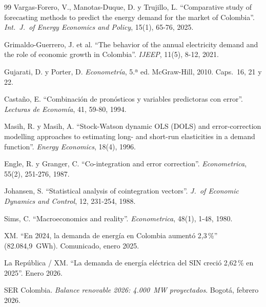 \documentclass[11pt,letterpaper]{article}
\begin{document}
\begin{thebibliography}{99}
 Vargas-Forero, V., Manotas-Duque, D. y Trujillo, L.
``Comparative study of forecasting methods to predict the energy demand for
the market of Colombia''. \emph{Int.\ J.\ of Energy Economics and Policy},
15(1), 65-76, 2025.

 Grimaldo-Guerrero, J. et al. ``The behavior of the
annual electricity demand and the role of economic growth in Colombia''.
\emph{IJEEP}, 11(5), 8-12, 2021.

 Gujarati, D. y Porter, D. \emph{Econometría}, 5.ª ed.
McGraw-Hill, 2010. Caps.\ 16, 21 y 22.

 Castaño, E. ``Combinación de pronósticos y variables
predictoras con error''. \emph{Lecturas de Economía}, 41, 59-80, 1994.

 Masih, R. y Masih, A. ``Stock-Watson dynamic OLS (DOLS)
and error-correction modelling approaches to estimating long- and short-run
elasticities in a demand function''. \emph{Energy Economics}, 18(4), 1996.

 Engle, R. y Granger, C. ``Co-integration and error
correction''. \emph{Econometrica}, 55(2), 251-276, 1987.

 Johansen, S. ``Statistical analysis of cointegration
vectors''. \emph{J.\ of Economic Dynamics and Control}, 12, 231-254, 1988.

 Sims, C. ``Macroeconomics and reality''.
\emph{Econometrica}, 48(1), 1-48, 1980.

 XM. ``En 2024, la demanda de energía en Colombia aumentó
2,3\,\%'' (82.084,9~GWh). Comunicado, enero 2025.

 La República / XM. ``La demanda de energía eléctrica del SIN
creció 2,62\,\% en 2025''. Enero 2026.

 SER Colombia. \emph{Balance renovable 2026: 4.000~MW
proyectados}. Bogotá, febrero 2026.

\end{thebibliography}
\endgroup

\clearpage
\appendix

\end{document}
